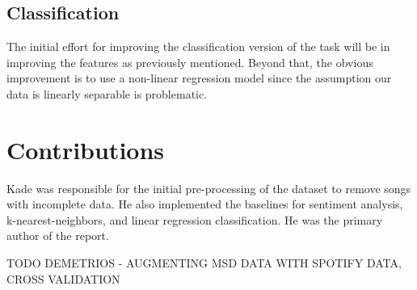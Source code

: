 \documentclass[10pt,journal,compsoc]{IEEEtran}
\begin{document}
\subsection{Classification}
The initial effort for improving the classification version of the task will be in improving the features as previously mentioned. Beyond that, the obvious improvement is to use a non-linear regression model since the assumption our data is linearly separable is problematic.

\section{Contributions}
Kade was responsible for the initial pre-processing of the dataset to remove songs with incomplete data. He also implemented the baselines for sentiment analysis, k-nearest-neighbors, and linear regression classification. He was the primary author of the report.

TODO DEMETRIOS - AUGMENTING MSD DATA WITH SPOTIFY DATA, CROSS VALIDATION

{}


%

\end{document}
